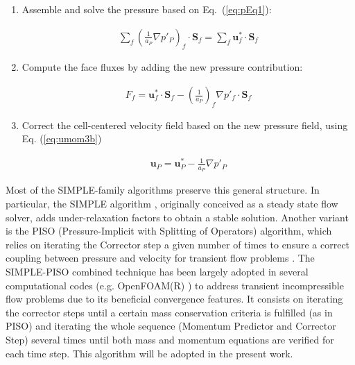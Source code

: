 \documentclass[final,3p,times,10pt,onecolumn]{myElsarticle}
\numberwithin{equation}{section}
\newcommand{\CIP}[1]{{\color{blue} #1}}
\begin{document}
\begin{enumerate}

\item Assemble and solve the pressure based on Eq.~(\ref{eq:pEq1}):

\begin{equation}
\begin{split}
\sum_{f} \left( \frac{1}{a_P} \nabla p'_P \right)_f \cdotp \textbf{S}_{f} = \sum_{f} \boldsymbol{u}^*_f \cdotp \textbf{S}_{f}
\end{split}
\label{eq:pEq2} 
\end{equation}



\item {\color{red}Compute} the face fluxes by adding the new pressure contribution:

\begin{equation}
\begin{split}
F_f = \boldsymbol{u}^*_f \cdotp \textbf{S}_{f} -  \left( \frac{1}{a_P}\right)_f \nabla p'_f  \cdotp \textbf{S}_{f}
\end{split}
\label{eq:Fhat} 
\end{equation}

\item Correct the cell-centered velocity field based on the new pressure field, using Eq. (\ref{eq:umom3b})

\begin{equation}\label{eq:umom3b}
\begin{split}
\boldsymbol{u}_P = \boldsymbol{u}^*_P - \frac{1}{a_P} \nabla p'_P 
\end{split}
\end{equation}

\end{enumerate}

\fi
Most of the SIMPLE-family algorithms preserve this general structure. In particular, the SIMPLE algorithm \cite{patankar1972}, originally conceived as a steady state flow solver, adds under-relaxation factors to obtain a stable solution. Another variant is the PISO {\color{red}(Pressure-Implicit with Splitting of Operators)} algorithm, which relies on iterating the Corrector step a given number of times to ensure a correct coupling between pressure and velocity for transient flow problems \cite{issa,issa2}. {\color{red} The SIMPLE-PISO combined technique has been largely adopted in several computational codes (e.g. OpenFOAM(R) \cite{ofpg}) to address transient incompressible flow problems due to its beneficial convergence features. It consists on iterating the corrector steps until a certain mass conservation criteria is fulfilled (as in PISO) and iterating the whole sequence (Momentum Predictor and Corrector Step) several times until both mass and momentum equations are verified for each time step. This algorithm will be adopted in the present work.}
\end{document}
